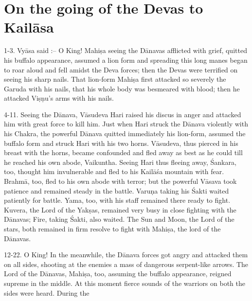 \chapter{On the going of the Devas to Kail\=asa}

1-3. Vy\=asa said :-- O King! Mahi\d{s}a seeing the D\=anavas afflicted with grief, quitted his buffalo appearance, assumed a lion form and spreading this long manes began to roar aloud and fell amidst the Deva forces; then the Devas were terrified on seeing his sharp nails. That lion-form Mahi\d{s}a first attacked so severely the Garuda with his nails, that his whole body was besmeared with blood; then he attacked Vi\d{s}\d{n}u's arms with his nails.

4-11. Seeing the D\=anava, V\=asudeva Hari raised his discus in anger and attacked him with great force to kill him. Just when Hari struck the D\=anava violently with his Chakra, the powerful D\=anava quitted immediately his lion-form, assumed the buffalo form and struck Hari with his two horns. V\=asudeva, thus pierced in his breast with the horns, became confounded and fled away as best as he could till he reached his own abode, Vaikuntha. Seeing Hari thus fleeing away, \'Sankara, too, thought him invulnerable and fled to his Kail\=a\'sa mountain with fear. Brahm\=a, too, fled to his own abode with terror; but the powerful V\=asava took patience and remained steady in the battle. Varu\d{n}a taking his \'Sakti waited patiently for battle. Yama, too, with his staff remained there ready to fight. Kuvera, the Lord of the Yak\d{s}as, remained very busy in close fighting with the D\=anavas; Fire, taking \'Sakti, also waited. The Sun and Moon, the Lord of the stars, both remained in firm resolve to fight with Mahi\d{s}a, the lord of the D\=anavas.

12-22. O King! In the meanwhile, the D\=anava forces got angry and attacked them on all sides, shooting at the enemies a mass of dangerous serpent-like arrows. The Lord of the D\=anavas, Mahi\d{s}a, too, assuming the buffalo appearance, reigned supreme in the middle. At this moment fierce sounds of the warriors on both the sides were heard. During the

